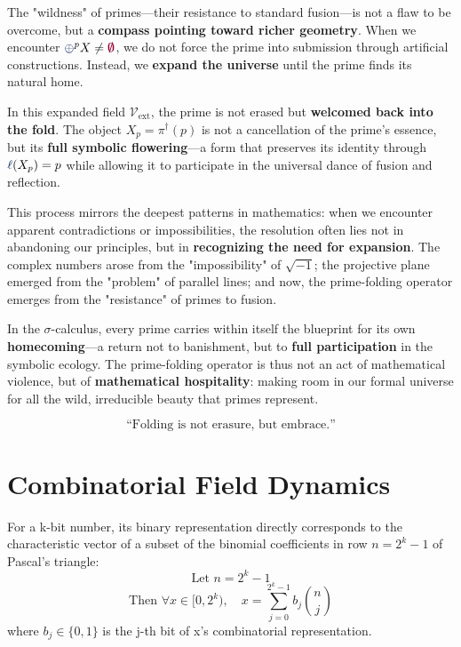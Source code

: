 The "wildness" of primes—their resistance to standard fusion—is not a flaw to be overcome, but a \textbf{compass pointing toward richer geometry}. When we encounter $\fuse^p X \neq \void$, we do not force the prime into submission through artificial constructions. Instead, we \textbf{expand the universe} until the prime finds its natural home.

In this expanded field $\mathcal{V}_{\text{ext}}$, the prime is not erased but \textbf{welcomed back into the fold}. The object $X_p = \pi^\dagger(p)$ is not a cancellation of the prime's essence, but its \textbf{full symbolic flowering}—a form that preserves its identity through $\lha(X_p) = p$ while allowing it to participate in the universal dance of fusion and reflection.

This process mirrors the deepest patterns in mathematics: when we encounter apparent contradictions or impossibilities, the resolution often lies not in abandoning our principles, but in \textbf{recognizing the need for expansion}. The complex numbers arose from the "impossibility" of $\sqrt{-1}$; the projective plane emerged from the "problem" of parallel lines; and now, the prime-folding operator emerges from the "resistance" of primes to fusion.

In the $\sigma$-calculus, every prime carries within itself the blueprint for its own \textbf{homecoming}—a return not to banishment, but to \textbf{full participation} in the symbolic ecology. The prime-folding operator is thus not an act of mathematical violence, but of \textbf{mathematical hospitality}: making room in our formal universe for all the wild, irreducible beauty that primes represent.

\[ \text{``Folding is not erasure, but embrace.''} \]

\section{Combinatorial Field Dynamics}

\begin{theorem}
For a k-bit number, its binary representation directly corresponds to the characteristic vector of a subset of the binomial coefficients in row $n = 2^k - 1$ of Pascal's triangle:
$$ \text{Let } n = 2^k - 1 $$
$$ \text{Then } \forall x \in [0, 2^k), \quad x = \sum_{j=0}^{2^k-1} b_j \binom{n}{j} $$
where $b_j \in \{0,1\}$ is the j-th bit of x's combinatorial representation.
\end{theorem}

